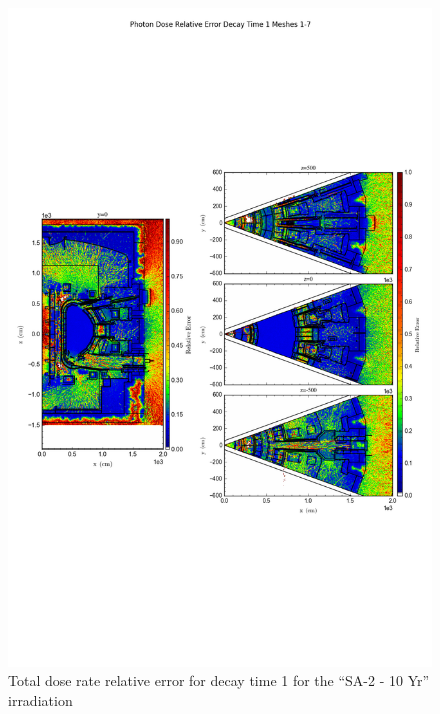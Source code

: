 \documentclass[12pt]{article}
\begin{document}
\begin{figure}[ht!]
\centering
\includegraphics[trim={0cm 8cm, 0cm 8cm},clip,scale=0.75]{../plots/final_model/5year/Photon_Dose_Relative_Error_Decay_Time_1_Meshes_1-7.png}
\caption{Total dose rate relative error for decay time 1 for the ``SA-2 - 10 Yr'' irradiation}
\label{fig:photons_5y_dc1_nob4c_relerr}
\end{figure}
\clearpage
\end{document}
